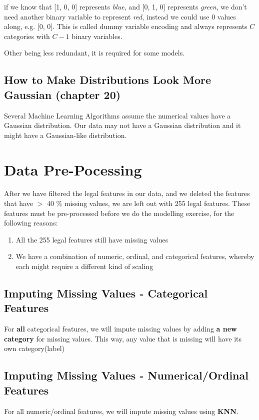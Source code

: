 \documentclass{article}
\begin{document}
\noindent if we know that [1, 0, 0] represents \textit{blue}, and [0, 1, 0] represents \textit{green}, we don't need another binary variable to represent \textit{red}, instead we could use 0 values along, e.g. [0, 0]. This is called dummy variable encoding and always represents $C$ categories with $C-1$ binary variables.

\noindent Other being less redundant, it is required for some models.

\subsection{How to Make Distributions Look More Gaussian (chapter 20)}
Several Machine Learning Algorithms assume the numerical values have a Gaussian distribution. Our data may not have a Gaussian distribution and it might have a Gaussian-like distribution.

\section{Data Pre-Pocessing}
After we have filtered the legal features in our data, and we deleted the features that have $>$ 40 \% missing values, we are left out with 255 legal features. These features must be pre-processed before we do the modelling exercise, for the following reasons:
\begin{enumerate}
\item All the 255 legal features still have missing values
\item We have a combination of numeric, ordinal, and categorical features, whereby each might require a different kind of scaling
\end{enumerate}

\subsection{Imputing Missing Values - Categorical Features}
For \textbf{all} categorical features, we will impute missing values by adding \textbf{a new category} for missing values. This way, any value that is missing will have its own category(label)

\subsection{Imputing Missing Values - Numerical/Ordinal Features}
For all numeric/ordinal features, we will impute missing values using \textbf{KNN}.
\end{document}
